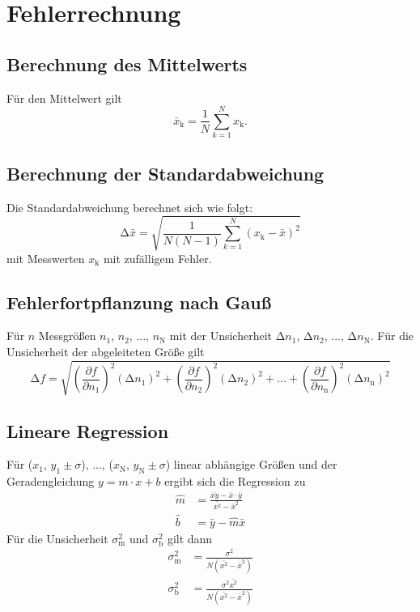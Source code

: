\section{Fehlerrechnung}
\label{sec:Fehlerrechnung}
\subsection{Berechnung des Mittelwerts}
  \label{sec:mittelwert}
  Für den Mittelwert gilt
  \begin{equation}
    \bar{x}_\text{k} = \frac{1}{N} \sum_{k = 1}^{N} x_\text{k}.
  \end{equation}
\subsection{Berechnung der Standardabweichung}
  \label{sec:standardabweichung}
  Die Standardabweichung berechnet sich wie folgt:
  \begin{equation}
    \increment \bar{x} = \sqrt{\frac{1}{N(N-1)} \sum_{k = 1}^{N}(x_\text{k} - \bar{x})^2 }
  \end{equation}
  mit Messwerten $x_\text{k}$ mit zufälligem Fehler.
\subsection{Fehlerfortpflanzung nach Gauß}
  \label{sec:fehlerfortpflanzung}
  Für $n$ Messgrößen $n_\text{1}$, $n_\text{2}$, ..., $n_\text{N}$ mit der Unsicherheit
  $\increment n_\text{1}$, $\increment n_\text{2}$, ..., $\increment n_\text{N}$. Für die Unsicherheit
  der abgeleiteten Größe gilt
  \begin{equation}
    \increment f = \sqrt{\left(\frac{\partial f}{\partial n_\text{1}} \right)^2 (\increment n_\text{1})^2 + \left(\frac{\partial f}{\partial n_\text{2}} \right)^2 (\increment
    n_\text{2})^2 + ... + \left(\frac{\partial
    f}{\partial  n_\text{n}} \right)^2 (\increment  n_\text{n})^2}
  \end{equation}
\subsection{Lineare Regression}
  \label{sec:regression}
  Für ($x_\text{1}$, $y_\text{1} \pm \sigma$), ..., ($x_\text{N}$, $y_\text{N} \pm \sigma$) linear abhängige Größen und der Geradengleichung $y = m \cdot x + b$ ergibt sich die
  Regression zu
  \begin{align}
    \hat{m}  & = \frac{\bar{xy} - \bar{x} \cdot \bar{y}}{\bar{x^2} - \bar{x}^2} \\
    \hat{b}  & = \bar{y} - \hat{m} \bar{x}
  \end{align}
  Für die Unsicherheit $\sigma_\text{m}^2$ und $\sigma_\text{b}^2$ gilt dann
  \begin{align}
    \sigma_\text{m}^2 & = \frac{\sigma^2}{N(\bar{x^2} - \bar{x}^2)} \\
    \sigma_\text{b}^2 & = \frac{\sigma^2 \bar{x^2}}{N(\bar{x^2} - \bar{x}^2)}
  \end{align}
